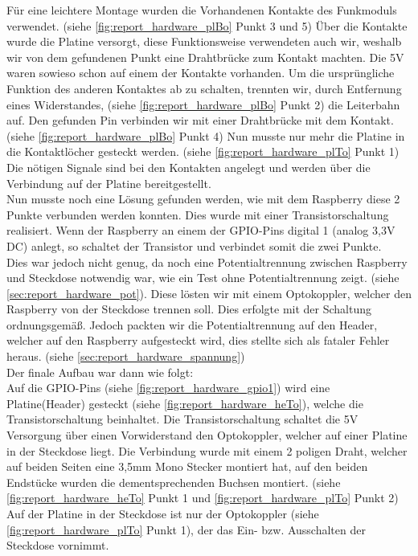 Für eine leichtere Montage wurden die Vorhandenen Kontakte des Funkmoduls verwendet. (siehe \autoref{fig:report_hardware_plBo} Punkt 3 und 5) Über die Kontakte wurde die Platine versorgt, diese Funktionsweise verwendeten auch wir, weshalb wir von dem gefundenen Punkt eine Drahtbrücke zum Kontakt machten. Die 5V waren sowieso schon auf einem der Kontakte vorhanden. Um die ursprüngliche Funktion des anderen Kontaktes ab zu schalten, trennten wir, durch Entfernung eines Widerstandes, (siehe \autoref{fig:report_hardware_plBo} Punkt 2) die Leiterbahn auf. Den gefunden Pin verbinden wir mit einer Drahtbrücke mit dem Kontakt. (siehe \autoref{fig:report_hardware_plBo} Punkt 4) Nun musste nur mehr die Platine in die Kontaktlöcher gesteckt werden. (siehe \autoref{fig:report_hardware_plTo} Punkt 1) Die nötigen Signale sind bei den Kontakten angelegt und werden über die Verbindung auf der Platine bereitgestellt.\\
Nun musste noch eine Lösung gefunden werden, wie mit dem Raspberry diese 2 Punkte verbunden werden konnten. Dies wurde mit einer Transistorschaltung realisiert. Wenn der Raspberry an einem der GPIO-Pins digital 1 (analog 3,3V DC) anlegt, so schaltet der Transistor und verbindet somit die zwei Punkte. \\
Dies war jedoch nicht genug, da noch eine Potentialtrennung zwischen Raspberry und Steckdose  notwendig war, wie ein Test ohne Potentialtrennung zeigt. (siehe \autoref{sec:report_hardware_pot}). Diese lösten wir mit einem Optokoppler, welcher den Raspberry von der Steckdose trennen soll. Dies erfolgte mit der Schaltung ordnungsgemäß. Jedoch packten wir die Potentialtrennung auf den Header, welcher auf den Raspberry aufgesteckt wird, dies stellte sich als fataler Fehler heraus. (siehe \autoref{sec:report_hardware_spannung})\\
Der finale Aufbau war dann wie folgt:\\
Auf die GPIO-Pins (siehe \autoref{fig:report_hardware_gpio1}) wird eine Platine(Header) gesteckt (siehe \autoref{fig:report_hardware_heTo}), welche die Transistorschaltung beinhaltet. Die Transistorschaltung schaltet die 5V Versorgung über einen Vorwiderstand den Optokoppler, welcher auf einer Platine in der Steckdose liegt. Die Verbindung wurde mit einem 2 poligen Draht, welcher auf beiden Seiten eine 3,5mm Mono Stecker montiert hat, auf den beiden Endstücke wurden die dementsprechenden Buchsen montiert. (siehe \autoref{fig:report_hardware_heTo} Punkt 1 und \autoref{fig:report_hardware_plTo} Punkt 2) Auf der Platine in der Steckdose ist nur der Optokoppler (siehe \autoref{fig:report_hardware_plTo} Punkt 1), der das Ein- bzw. Ausschalten der Steckdose vornimmt.\\\\
